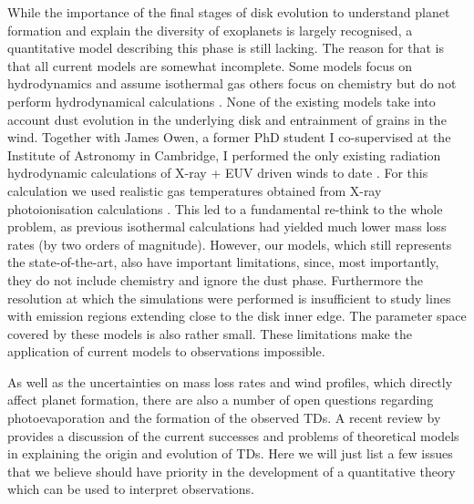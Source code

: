 \documentclass[10pt,fleqn,twoside]{article}
\begin{document}
While the importance of the final stages
of disk evolution to understand planet formation and explain the
diversity of exoplanets is largely recognised, a quantitative model describing this phase is
still lacking. The reason for that is that all current models are
somewhat 
incomplete. Some models focus on hydrodynamics and 
assume isothermal gas 
\citep[e.g.\ the EUV-only model of][]{2004ApJ...607..890F}
others focus on
chemistry but do not perform hydrodynamical calculations 
\citep[e.g.\ the FUV model of][]{2009ApJ...705.1237G}.
None of the existing models take into
account dust evolution in the underlying disk and entrainment of
grains in the wind. Together with James Owen, a former PhD student I co-supervised
at the Institute of Astronomy in Cambridge, I performed
the only existing radiation hydrodynamic calculations of X-ray  + EUV driven
winds to date 
\citep{2010MNRAS.401.1415O, 2011MNRAS.412...13O,
  2012MNRAS.422.1880O}. For this calculation
we used realistic gas
temperatures obtained from X-ray photoionisation calculations
\citep{2008ApJ...688..398E, 2009ApJ...699.1639E}.
This led to a fundamental re-think to the
whole problem, as previous isothermal calculations had yielded much
lower mass loss rates (by two orders of magnitude). However, our
models, which still represents the state-of-the-art, also have
important limitations, since, most importantly, they do not include
chemistry and ignore the dust phase. Furthermore the resolution at
which the simulations were performed is insufficient to study lines with
emission regions extending close to the disk inner edge. The parameter
space covered by these models is also rather small. These
limitations make the application of current models to observations
impossible.  

As well as the uncertainties on mass loss rates and wind profiles,
which directly affect planet formation, there are also a number of
open questions regarding photoevaporation and the formation of the
observed TDs. A recent review by 
\citet{2016PASA...33....5O}
provides a discussion of
the current successes and problems of theoretical models in
explaining the origin and evolution of TDs. Here we will just list a
few issues that we believe should have priority in the development of a
quantitative theory which can be used to interpret observations. 
\end{document}
